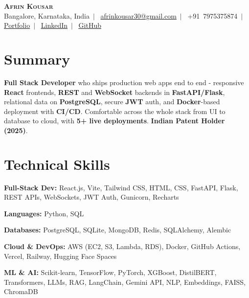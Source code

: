 \documentclass[letterpaper,9pt]{article}
\begin{document}
\begin{center}
  {\LARGE\scshape\textbf{Afrin Kousar}}\\\vspace{3pt}
  \footnotesize
  Bangalore, Karnataka, India~$|$~
  \href{mailto:afrinkousar30@gmail.com}{afrinkousar30@gmail.com}~$|$~
  +91~7975375874~$|$~
  \href{https://afrin-kousar.netlify.app/}{\underline{Portfolio}}~$|$~
  \href{https://linkedin.com/in/afrin-kousar}{\underline{LinkedIn}}~$|$~
  \href{https://github.com/afrin2315}{\underline{GitHub}}
\end{center}
\vspace{-7pt}

\section{Summary}
{\scriptsize
\textbf{Full Stack Developer} who ships production web apps end to end - responsive \textbf{React} frontends, \textbf{REST} and \textbf{WebSocket} backends in \textbf{FastAPI/Flask}, relational data on \textbf{PostgreSQL}, secure \textbf{JWT} auth, and \textbf{Docker}-based deployment with \textbf{CI/CD}. Comfortable across the whole stack from UI to database to cloud, with \textbf{5+ live deployments}. \textbf{Indian Patent Holder (2025)}.
}

\section{Technical Skills}
\begin{itemize}[leftmargin=0.1in,label={},itemsep=1pt,topsep=2pt,parsep=0pt]
  \scriptsize{
    \item \textbf{Full-Stack Dev:} React.js, Vite, Tailwind CSS, HTML, CSS, FastAPI, Flask, REST APIs, WebSockets, JWT Auth, Gunicorn, Recharts
    \item \textbf{Languages:} Python, SQL
    \item \textbf{Databases:} PostgreSQL, SQLite, MongoDB, Redis, SQLAlchemy, Alembic
    \item \textbf{Cloud \& DevOps:} AWS (EC2, S3, Lambda, RDS), Docker, GitHub Actions, Vercel, Railway, Hugging Face Spaces
    \item \textbf{ML \& AI:} Scikit-learn, TensorFlow, PyTorch, XGBoost, DistilBERT, Transformers, LLMs, RAG, LangChain, Gemini API, NLP, Embeddings, FAISS, ChromaDB
  }
\end{itemize}
\end{document}
